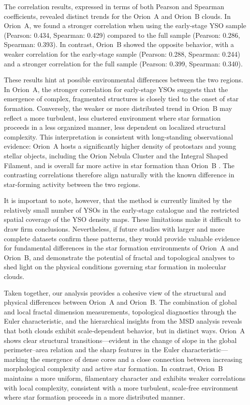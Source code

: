 The correlation results, expressed in terms of both Pearson and Spearman coefficients, revealed distinct trends for the Orion~A and Orion~B clouds. In Orion~A, we found a stronger correlation when using the early-stage YSO sample (Pearson: 0.434, Spearman: 0.429) compared to the full sample (Pearson: 0.286, Spearman: 0.393). In contrast, Orion~B showed the opposite behavior, with a weaker correlation for the early-stage sample (Pearson: 0.288, Spearman: 0.244) and a stronger correlation for the full sample (Pearson: 0.399, Spearman: 0.340).

These results hint at possible environmental differences between the two regions.  
In Orion~A, the stronger correlation for early-stage YSOs suggests that the emergence of complex, fragmented structures is closely tied to the onset of star formation.  
Conversely, the weaker or more distributed trend in Orion~B may reflect a more turbulent, less clustered environment where star formation proceeds in a less organized manner, less dependent on localized structural complexity.  
This interpretation is consistent with long-standing observational evidence: Orion~A hosts a significantly higher density of protostars and young stellar objects, including the Orion Nebula Cluster and the Integral Shaped Filament, and is overall far more active in star formation than Orion~B \cite{megeath2012catalogue}.  
The contrasting correlations therefore align naturally with the known difference in star-forming activity between the two regions.

It is important to note, however, that the method is currently limited by the relatively small number of YSOs in the early-stage catalogue and the restricted spatial coverage of the YSO density maps. These limitations make it difficult to draw firm conclusions. Nevertheless, if future studies with larger and more complete datasets confirm these patterns, they would provide valuable evidence for fundamental differences in the star formation environments of Orion~A and Orion~B, and demonstrate the potential of fractal and topological analyses to shed light on the physical conditions governing star formation in molecular clouds.

Taken together, our analysis provides a cohesive view of the structural and physical differences between Orion~A and Orion~B.  
The combination of global and local fractal dimension measurements, topological diagnostics through the Euler characteristic, and the hierarchical insights from the MSD analysis reveals that both clouds exhibit scale‑dependent behavior, but in distinct ways.  
Orion~A shows clear structural transitions—evident in the change of slope in the global perimeter–area relation and the sharp features in the Euler characteristic—marking the emergence of dense cores and a close connection between increasing morphological complexity and active star formation.  
In contrast, Orion~B maintains a more uniform, filamentary character and exhibits weaker correlations with local complexity, consistent with a more turbulent, scale‑free environment where star formation proceeds in a more distributed manner.  

